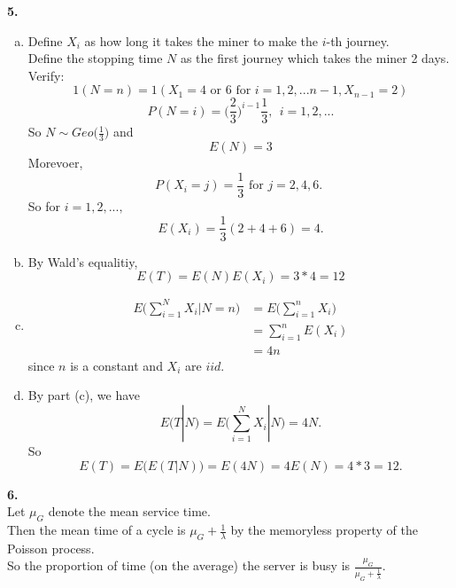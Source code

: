 \documentclass{amsart}
\theoremstyle{plain}
\theoremstyle{definition}
\begin{document}
\noindent \textbf{5.} 
\begin{enumerate}[(a)]
	\item
		Define $X_i$ as how long it takes the miner to make the $i$-th journey. \\
		Define the stopping time $N$ as the first journey which takes the miner 2 days.\\ 
		Verify: 
		\[1(N=n) = 1(X_1 = 4\text{ or }6 \text{ for } i = 1,2,...n-1, X_{n-1} = 2)	\]		 
		\[P(N=i) = \Big({\frac{2}{3}}\Big)^{i-1}\frac{1}{3},\ \ i = 1,2,...\]
		So $N\sim Geo\Big(\frac{1}{3}\Big)$ and  
		\[E(N) = 3\]
		Morevoer,
		\[ P(X_i = j) = \frac{1}{3}\text{ for $j=2,4,6$. } \]
		So for $i=1,2,...,$
		\[E(X_i) = \frac{1}{3}(2+4+6) = 4.\]
	\item
		By Wald's equalitiy,
		\[ E(T)  = E(N)E(X_i) = 3*4 = 12\]
	\item
		\begin{align*}
			E\Bigg(\sum_{i=1}^NX_i|N=n\Bigg) &= E\Bigg(\sum_{i=1}^nX_i\Bigg )\\
											 &=\sum_{i=1}^nE(X_i)\\
											 &=4n
		\end{align*}
		since $n$ is a constant and $X_i$ are $iid$.\\
	\item
		By part (c), we have 
		\[E(T|N) = E\Bigg(\sum_{i=1}^NX_i|N\Bigg) =4N.\]
		So
		\[ E(T)= E\big(E(T|N)\big) = E(4N) = 4E(N) = 4*3 = 12. \]
\end{enumerate}

\noindent \textbf{6.} \\
Let $\mu_G$ denote the mean service time.\\
Then the mean time of a cycle is $\mu_G + \frac{1}{\lambda}$ by the memoryless property of the Poisson process.\\
So the proportion of time (on the average) the server is busy is $\frac{\mu_G}{\mu_G + \frac{1}{\lambda}}$.
\end{document}
